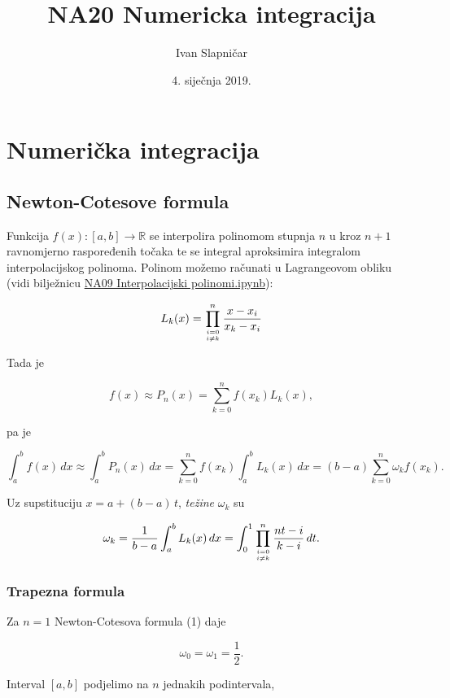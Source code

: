 \documentclass[11pt]{article}
\title{NA20 Numericka integracija}
\author{Ivan Slapničar}
\date{4. siječnja 2019.}
\begin{document}
    
    
    \maketitle
    
    

    
    \hypertarget{numeriux10dka-integracija}{%
\section{Numerička integracija}\label{numeriux10dka-integracija}}

\hypertarget{newton-cotesove-formula}{%
\subsection{Newton-Cotesove formula}\label{newton-cotesove-formula}}

Funkcija \(f(x):[a,b]\to\mathbb{R}\) se interpolira polinomom stupnja
\(n\) u kroz \(n+1\) ravnomjerno raspoređenih točaka te se integral
aproksimira integralom interpolacijskog polinoma. Polinom možemo
računati u Lagrangeovom obliku\\
(vidi bilježnicu
\href{NA09\%20Interpolacijski\%20polinomi.ipynb}{NA09 Interpolacijski polinomi.ipynb}):

\[
L_k(x)=\prod_{{i=0}\atop {i\neq k}}^n \frac{x-x_i}{x_k-x_i}
\]

Tada je

\[
f(x)\approx P_n(x)=\sum_{k=0}^n f(x_k) L_k(x),
\]

pa je

\[
\int_a^b f(x)\, dx\approx \int_a^b P_n(x) \, dx=\sum_{k=0}^n f(x_k) \int_a^b L_k(x)\, dx =(b-a)\sum_{k=0}^n \omega_k f(x_k). \tag{1}
\]

Uz supstituciju \(x=a+(b-a)\,t\), \emph{težine} \(\omega_k\) su

\[
\omega_k=\frac{1}{b-a}\int_a^b L_k(x)\, dx = \int_0^1 \prod_{{i=0}\atop {i\neq k}}^n \frac{nt-i}{k-i} \, dt.
\]

\hypertarget{trapezna-formula}{%
\subsubsection{Trapezna formula}\label{trapezna-formula}}

Za \(n=1\) Newton-Cotesova formula (1) daje

\[\omega_0=\omega_1=\frac{1}{2}.\]

Interval \([a,b]\) podjelimo na \(n\) jednakih podintervala,
\end{document}
